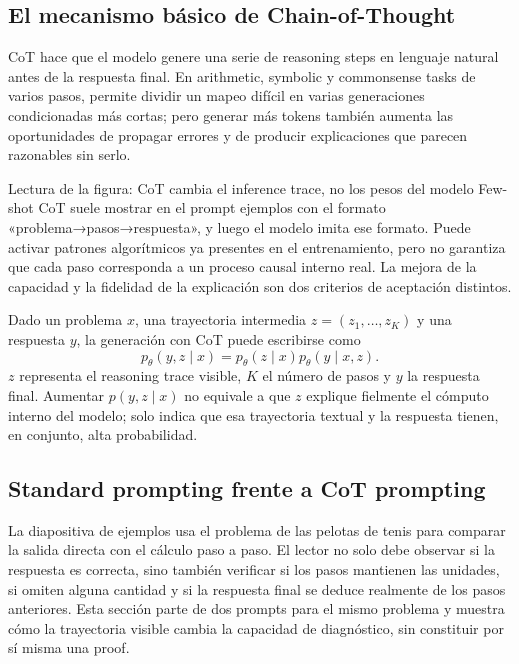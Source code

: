 \subsection{El mecanismo básico de Chain-of-Thought}

CoT hace que el modelo genere una serie de reasoning steps en lenguaje natural antes de la respuesta final. En arithmetic, symbolic y commonsense tasks de varios pasos, permite dividir un mapeo difícil en varias generaciones condicionadas más cortas; pero generar más tokens también aumenta las oportunidades de propagar errores y de producir explicaciones que parecen razonables sin serlo.


\begin{knowledgebox}{Lectura de la figura: CoT cambia el inference trace, no los pesos del modelo}
Few-shot CoT suele mostrar en el prompt ejemplos con el formato «problema→pasos→respuesta», y luego el modelo imita ese formato. Puede activar patrones algorítmicos ya presentes en el entrenamiento, pero no garantiza que cada paso corresponda a un proceso causal interno real. La mejora de la capacidad y la fidelidad de la explicación son dos criterios de aceptación distintos.
\end{knowledgebox}

Dado un problema $x$, una trayectoria intermedia $z=(z_1,\ldots,z_K)$ y una respuesta $y$, la generación con CoT puede escribirse como
\[
p_\theta(y,z\mid x)=p_\theta(z\mid x)p_\theta(y\mid x,z).
\]
$z$ representa el reasoning trace visible, $K$ el número de pasos y $y$ la respuesta final. Aumentar $p(y,z\mid x)$ no equivale a que $z$ explique fielmente el cómputo interno del modelo; solo indica que esa trayectoria textual y la respuesta tienen, en conjunto, alta probabilidad.

\subsection{Standard prompting frente a CoT prompting}

La diapositiva de ejemplos usa el problema de las pelotas de tenis para comparar la salida directa con el cálculo paso a paso. El lector no solo debe observar si la respuesta es correcta, sino también verificar si los pasos mantienen las unidades, si omiten alguna cantidad y si la respuesta final se deduce realmente de los pasos anteriores. Esta sección parte de dos prompts para el mismo problema y muestra cómo la trayectoria visible cambia la capacidad de diagnóstico, sin constituir por sí misma una proof.

